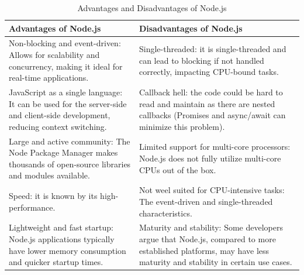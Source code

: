 \begin{table}[H]
    \centering
    \begin{tabularx}{\textwidth}{|X|X|}
        \hline
        \textbf{Advantages of Node.js}                                                                                                               & \textbf{Disadvantages of Node.js}                                                                                                                              \\
        \hline
        Non-blocking and event-driven: Allows for scalability and concurrency, making it ideal for real-time applications.                    & Single-threaded: it is single-threaded and can lead to blocking if not handled correctly, impacting CPU-bound tasks.                                   \\
        \hline
        JavaScript as a single language: It can be used for the server-side and client-side development, reducing context switching. & Callback hell: the code could be hard to read and maintain as there are nested callbacks (Promises and async/await can minimize this problem).                      \\
        \hline
        Large and active community: The Node Package Manager makes thousands of open-source libraries and modules available.                 & Limited support for multi-core processors: Node.js does not fully utilize multi-core CPUs out of the box.                                                      \\
        \hline
        Speed: it is known by its high-performance.                                               & Not weel suited for CPU-intensive tasks: The event-driven and single-threaded characteristics.           \\
        \hline
        Lightweight and fast startup: Node.js applications typically have lower memory consumption and quicker startup times.                        & Maturity and stability: Some developers argue that Node.js, compared to more established platforms, may have less maturity and stability in certain use cases. \\
        \hline
    \end{tabularx}
    
    \caption{Advantages and Disadvantages of Node.js}
    \label{tab:node-js-advantages-disadvantages}
\end{table}



